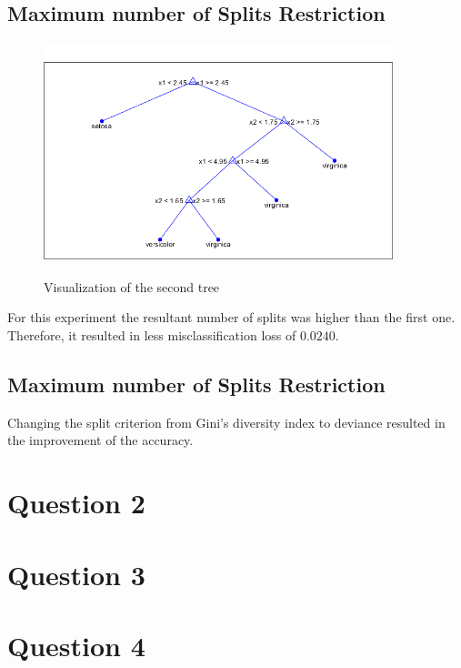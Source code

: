\documentclass[11pt]{extarticle}
\begin{document}
\subsection{Maximum number of Splits Restriction}
\vspace*{-.5cm}
\begin{center}
    \begin{figure}[h]
        {\includegraphics[width = 4in, height = 2.5in]{QT_maxsplit.png}}
        \caption{Visualization of the second tree}
        \label{fig:q1_tree_split}
    \end{figure}
\end{center}
\vspace*{-1cm}
For this experiment the resultant number of splits was higher than the first one. Therefore, it resulted in less misclassification loss of $0.0240$.

\subsection{Maximum number of Splits Restriction}

Changing the split criterion from Gini's diversity index to deviance resulted in the improvement of the accuracy.

\section{Question 2}


\section{Question 3}


\section{Question 4}


\pagebreak
\end{document}
